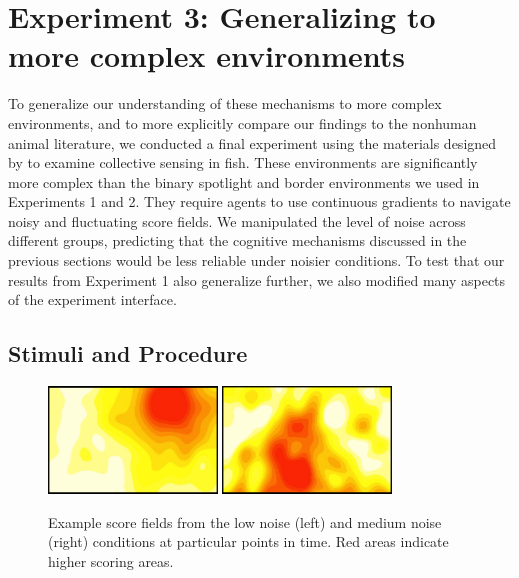 \documentclass[12pt,letterpaper]{article}
\begin{document}
\section{Experiment 3: Generalizing to more complex environments}

To generalize our understanding of these mechanisms to more complex environments, and to more explicitly compare our findings to the nonhuman animal literature, we conducted a final experiment using the materials designed by  to examine collective sensing in fish.
These environments are significantly more complex than the binary spotlight and border environments we used in Experiments 1 and 2.
They require agents to use continuous gradients to navigate noisy and fluctuating score fields.
We manipulated the level of noise across different groups, predicting that the cognitive mechanisms discussed in the previous sections would be less reliable under noisier conditions. To test that our results from Experiment 1 also generalize further, we also modified many aspects of the experiment interface.

\subsection{Stimuli and Procedure}

\begin{figure}
  \centering
  \includegraphics[width=0.4\textwidth]{./figures/easy-field}
  \hspace{0.1cm}
  \includegraphics[width=0.4\textwidth]{./figures/medium-field}
  \caption{Example score fields from the low noise (left) and medium
    noise (right) conditions at particular points in time.  Red areas
    indicate higher scoring areas.}
  \label{fig:score_exp3}
\end{figure}
\end{document}
